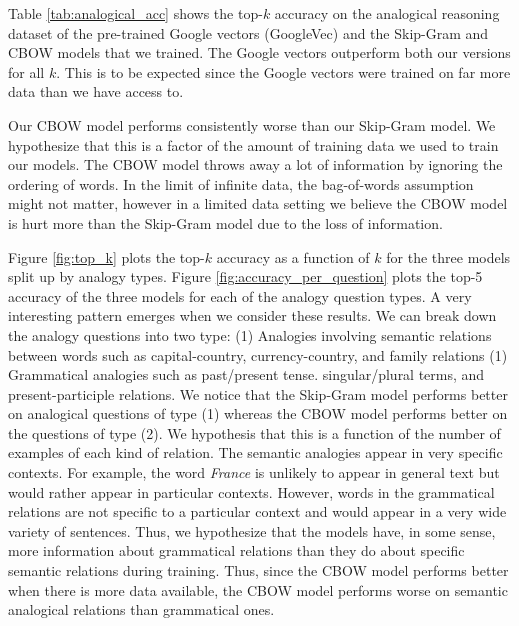 Table \ref{tab:analogical_acc} shows the top-$k$ accuracy on the analogical reasoning dataset of the pre-trained Google vectors (GoogleVec) and the Skip-Gram and CBOW models that we trained. The Google vectors outperform both our versions for all $k$. This is to be expected since the Google vectors were trained on far more data than we have access to. 

Our CBOW model performs consistently worse than our Skip-Gram model. We hypothesize that this is a factor of the amount of training data we used to train our models. The CBOW model throws away a lot of information by ignoring the ordering of words. In the limit of infinite data, the bag-of-words assumption might not matter, however in a limited data setting we believe the CBOW model is hurt more than the Skip-Gram model due to the loss of information. 

Figure \ref{fig:top_k} plots the top-$k$ accuracy as a function of $k$ for the three models split up by analogy types. Figure \ref{fig:accuracy_per_question}  plots the top-5 accuracy of the three models for each of the analogy question types. A very interesting pattern emerges when we consider these results. We can break down the analogy questions into two type: (1) Analogies involving semantic relations between words such as capital-country, currency-country, and family relations (1) Grammatical analogies such as past/present tense. singular/plural terms, and present-participle relations. We notice that the Skip-Gram model performs better on analogical questions of type (1) whereas the CBOW model performs better on the questions of type (2). We hypothesis that this is a function of the number of examples of each kind of relation. The semantic analogies appear in very specific contexts. For example, the word {\it France} is unlikely to appear in general text but would rather appear in particular contexts. However, words in the grammatical relations are not specific to a particular context and would appear in a very wide variety of sentences. Thus, we hypothesize that the models have, in some sense, more information about grammatical relations than they do about specific semantic relations during training. Thus, since the CBOW model performs better when there is more data available, the CBOW model performs worse on semantic analogical relations than grammatical ones. 


